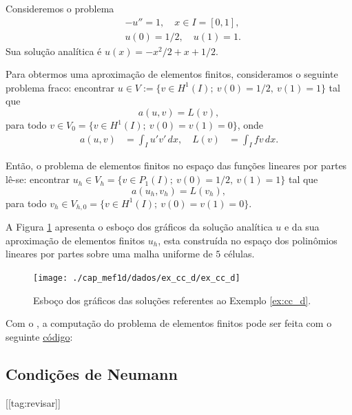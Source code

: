 \begin{ex}\label{ex:cc_d}
  Consideremos o problema
  \begin{align}
    &-u'' = 1,\quad x\in I=[0,1],\label{eq:ex_cc_d_eq}\\
    &u(0) = 1/2,\quad u(1) = 1.\label{eq:ex_cc_d_bc}
  \end{align}
Sua solução analítica é $u(x) = -x^2/2+x+1/2$. 

Para obtermos uma aproximação de elementos finitos, consideramos o seguinte problema fraco: encontrar $u\in V := \{v\in H^1(I);~v(0)=1/2,~v(1)=1\}$ tal que
\begin{equation}
  a(u,v) = L(v),
\end{equation}
para todo $v\in V_0 = \{v\in H^1(I);~v(0)=v(1)=0\}$, onde
\begin{align}
  a(u, v) &= \int_I u'v'\,dx,\quad L(v) &= \int_I fv\,dx.
\end{align}

Então, o problema de elementos finitos no espaço das funções lineares por partes lê-se: encontrar $u_h\in V_h = \{v\in P_1(I);~v(0)=1/2,~v(1)=1\}$ tal que
\begin{equation}
  a(u_h, v_h) = L(v_h),
\end{equation}
para todo $v_h\in V_{h,0} = \{v\in H^1(I);~v(0)=v(1)=0\}$.

A Figura \ref{fig:ex_cc_d} apresenta o esboço dos gráficos da solução analítica $u$ e da sua aproximação de elementos finitos $u_h$, esta construída no espaço dos polinômios lineares por partes sobre uma malha uniforme de $5$ células.

\begin{figure}[h!]
  \centering
  \texttt{[image: ./cap\_mef1d/dados/ex\_cc\_d/ex\_cc\_d]}
  \caption{Esboço dos gráficos das soluções referentes ao Exemplo \ref{ex:cc_d}.}
  \label{fig:ex_cc_d}
\end{figure}

\ifispython
Com o \fenics, a computação do problema de elementos finitos pode ser feita com o seguinte \href{https://github.com/phkonzen/notas/blob/master/src/MetodoElementosFinitos/cap_mef1d/dados/ex_cc_d/ex_cc_d.py}{código}:

\fi
\end{ex}

\subsection{Condições de Neumann}
[[tag:revisar]]

